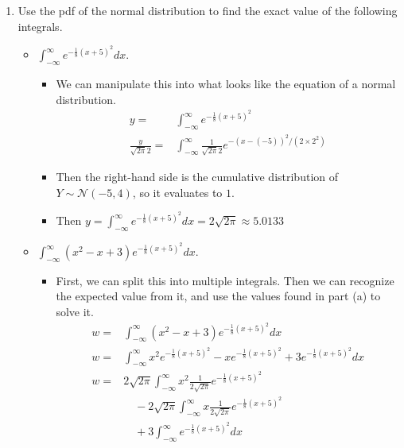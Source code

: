 \documentclass{article}
\begin{document}
\begin{enumerate}
\item Use the pdf of the normal distribution to find the exact value of the following integrals.
    \begin{itemize}
    \item $\int_{-\infty}^{\infty}e^{-\frac{1}{8}(x+5)^2}dx$.
        \begin{itemize}
        \item We can manipulate this into what looks like the equation of a normal distribution.
        \begin{equation*}
            \begin{aligned}
            y = & \int_{-\infty}^{\infty}e^{-\frac{1}{8}(x+5)^2} \\
            \frac{y}{\sqrt{2 \pi} 2} = & \int_{-\infty}^{\infty} \frac{1}{\sqrt{2 \pi} 2} e^{-(x - (-5))^2 / (2 \times 2^2)}
            \end{aligned}
        \end{equation*}
        \item Then the right-hand side is the cumulative distribution of $Y \sim \mathcal{N}(-5, 4)$, so it evaluates to $1$.
        \item Then $y = \int_{-\infty}^{\infty}e^{-\frac{1}{8}(x+5)^2}dx = 2 \sqrt{2 \pi} \approx 5.0133 $
        \end{itemize}
    \item $\int_{-\infty}^{\infty}(x^2-x+3)e^{-\frac{1}{8}(x+5)^2}dx$.
        \begin{itemize}
        \item First, we can split this into multiple integrals. Then we can recognize the expected value from it, and use the values found in part (a) to solve it.
        \begin{equation*}
            \begin{aligned}
            w = & \int_{-\infty}^{\infty}(x^2-x+3)e^{-\frac{1}{8}(x+5)^2}dx \\
            w = & \int_{-\infty}^{\infty}x^2 e^{-\frac{1}{8}(x+5)^2} - x e^{-\frac{1}{8}(x+5)^2} + 3 e^{-\frac{1}{8}(x+5)^2}dx \\
            w = & 2\sqrt{2 \pi} \int_{-\infty}^{\infty}x^2 \frac{1}{2\sqrt{2 \pi}} e^{-\frac{1}{8}(x+5)^2} \\
                & \quad - 2\sqrt{2 \pi} \int_{-\infty}^{\infty} x \frac{1}{2\sqrt{2 \pi}} e^{-\frac{1}{8}(x+5)^2} \\
                & \quad + 3\int_{-\infty}^{\infty} e^{-\frac{1}{8}(x+5)^2}dx \\

\end{aligned}
\end{equation*}
\end{itemize}
\end{itemize}
\end{enumerate}
\end{document}
